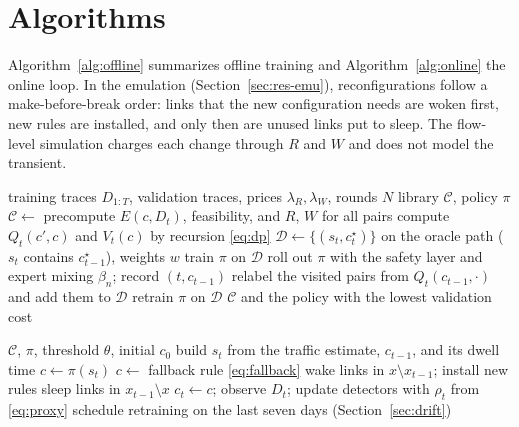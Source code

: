 \documentclass[journal]{IEEEtran}
\begin{document}
\section{Algorithms}\label{sec:algorithms}

Algorithm~\ref{alg:offline} summarizes offline training and Algorithm~\ref{alg:online} the online loop. In the emulation (Section~\ref{sec:res-emu}), reconfigurations follow a make-before-break order: links that the new configuration needs are woken first, new rules are installed, and only then are unused links put to sleep. The flow-level simulation charges each change through $R$ and $W$ and does not model the transient.

\begin{algorithm}[t]
\caption{LiRA Offline Training}
\label{alg:offline}
\footnotesize
\begin{algorithmic}[1]
\Require training traces $D_{1:T}$, validation traces, prices $\lambda_R,\lambda_W$, rounds $N$
\Ensure library $\mathcal{C}$, policy $\pi$
\State $\mathcal{C}\gets$  
\State precompute $E(c,D_t)$, feasibility, and $R$, $W$ for all pairs
\State compute $Q_t(c',c)$ and $V_t(c)$ by recursion \eqref{eq:dp}
\State $\mathcal{D}\gets\{(s_t,c^\star_t)\}$ on the oracle path ($s_t$ contains $c^\star_{t-1}$), weights $w$
\State train $\pi$ on $\mathcal{D}$
\State roll out $\pi$ with the safety layer and expert mixing $\beta_n$; record $(t,c_{t-1})$
\State relabel the visited pairs from $Q_t(c_{t-1},\cdot)$ and add them to $\mathcal{D}$
\State retrain $\pi$ on $\mathcal{D}$
\EndFor
\State \Return $\mathcal{C}$ and the policy with the lowest validation cost
\end{algorithmic}
\end{algorithm}

\begin{algorithm}[t]
\caption{LiRA Online Control Loop}
\label{alg:online}
\footnotesize
\begin{algorithmic}[1]
\Require $\mathcal{C}$, $\pi$, threshold $\theta$, initial $c_0$
\State build $s_t$ from the traffic estimate, $c_{t-1}$, and its dwell time
\State $c\gets\pi(s_t)$
\State $c\gets$ fallback rule \eqref{eq:fallback}
\EndIf
{}
\State wake links in $x\setminus x_{t-1}$; install new rules
\State sleep links in $x_{t-1}\setminus x$
\EndIf
\State $c_t\gets c$; observe $D_t$; update detectors with $\rho_t$ from \eqref{eq:proxy}
\State schedule retraining on the last seven days (Section~\ref{sec:drift})
\EndIf
\EndFor
\end{algorithmic}
\end{algorithm}
\end{document}
